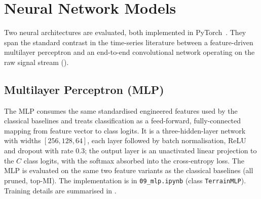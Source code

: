 \begin{table}[H]
\centering
{}
\caption{Hyperparameter search grids and the configurations selected by \texttt{RandomizedSearchCV} on each classification problem. The \texttt{clf\_\_} prefix used by scikit-learn pipelines is omitted for readability.}
\label{tab:tuned_hparams}
\end{table}

\vspace{-6mm}
\section{Neural Network Models}
\label{sec:neural_models}

Two neural architectures are evaluated, both implemented in PyTorch~\cite{Paszke2019}. They span the standard contrast in the time-series literature between a feature-driven multilayer perceptron and an end-to-end convolutional network operating on the raw signal stream ().

\subsection{Multilayer Perceptron (MLP)}

The MLP consumes the same standardised engineered features used by the classical baselines and treats classification as a feed-forward, fully-connected mapping from feature vector to class logits. It is a three-hidden-layer network with widths $[256, 128, 64]$, each layer followed by batch normalisation, ReLU and dropout with rate $0.3$; the output layer is an unactivated linear projection to the $C$ class logits, with the softmax absorbed into the cross-entropy loss. The MLP is evaluated on the same two feature variants as the classical baselines (all pruned, top-MI). The implementation is in \texttt{09\_mlp.ipynb} (class \texttt{TerrainMLP}). Training details are summarised in .

